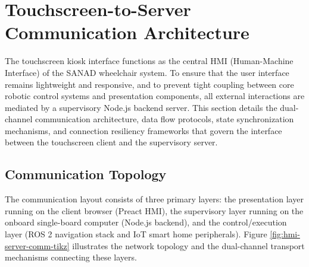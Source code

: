 \section{Touchscreen-to-Server Communication Architecture}
The touchscreen kiosk interface functions as the central HMI (Human-Machine Interface) of the SANAD wheelchair system. To ensure that the user interface remains lightweight and responsive, and to prevent tight coupling between core robotic control systems and presentation components, all external interactions are mediated by a supervisory Node.js backend server. This section details the dual-channel communication architecture, data flow protocols, state synchronization mechanisms, and connection resiliency frameworks that govern the interface between the touchscreen client and the supervisory server.

\subsection{Communication Topology}
The communication layout consists of three primary layers: the presentation layer running on the client browser (Preact HMI), the supervisory layer running on the onboard single-board computer (Node.js backend), and the control/execution layer (ROS 2 navigation stack and IoT smart home peripherals). Figure \ref{fig:hmi-server-comm-tikz} illustrates the network topology and the dual-channel transport mechanisms connecting these layers.


